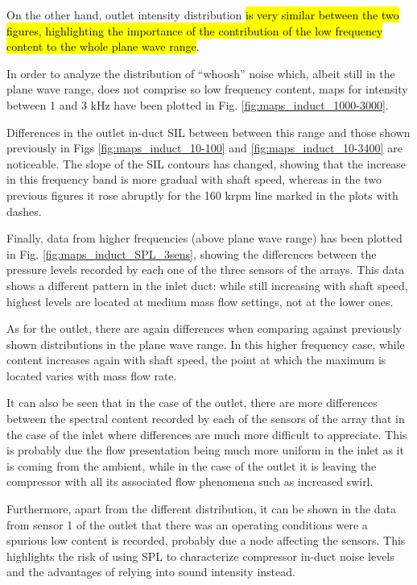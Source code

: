 On the other hand, outlet intensity distribution \hl{is very similar between the two figures, highlighting the importance of the contribution of the low frequency content to the whole plane wave range}.

In order to analyze the distribution of ``whoosh'' noise which, albeit still in the plane wave range, does not comprise so low frequency content, maps for intensity between 1 and 3 kHz have been plotted in Fig. \ref{fig:maps_induct_1000-3000}.

Differences in the outlet in-duct SIL between between this range and those shown previously in Figs \ref{fig:maps_induct_10-100} and \ref{fig:maps_induct_10-3400} are noticeable. The slope of the SIL contours has changed, showing that the increase in this frequency band is more gradual with shaft speed, whereas in the two previous figures it rose abruptly for the 160 krpm line marked in the plots with dashes.

Finally, data from higher frequencies (above plane wave range) has been plotted in Fig. \ref{fig:maps_induct_SPL_3sens}, showing the differences between the pressure levels recorded by each one of the three sensors of the arrays. This data shows a different pattern in the inlet duct: while still increasing with shaft speed, highest levels are located at medium mass flow settings, not at the lower ones.

As for the outlet, there are again differences when comparing against previously shown distributions in the plane wave range. In this higher frequency case, while content increases again with shaft speed, the point at which the maximum is located varies with mass flow rate.

It can also be seen that in the case of the outlet, there are more differences between the spectral content recorded by each of the sensors of the array that in the case of the inlet where differences are much more difficult to appreciate. This is probably due the flow presentation being much more uniform in the inlet as it is coming from the ambient, while in the case of the outlet it is leaving the compressor with all its associated flow phenomena such as increased swirl.

Furthermore, apart from the different distribution, it can be shown in the data from sensor 1 of the outlet that there was an operating conditions were a spurious low content is recorded, probably due a node affecting the sensors. This highlights the risk of using SPL to characterize compressor in-duct noise levels and the advantages of relying into sound intensity instead.

